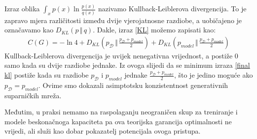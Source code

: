 Izraz oblika $\int_{x} p(x) \ln \frac{p(x)}{q(x)}$ nazivamo Kullback-Leiblerova divergencija. To je zapravo mjera različitosti između dvije vjerojatnosne razdiobe, a uobičajeno je označavamo kao $D_{KL}(p \, \Vert \, q)$. Dakle, 
izraz \ref{KL} možemo zapisati kao:
\begin{align}
C(G) = -\ln 4 + D_{KL}(p_{\mathcal{D}} \, \Vert \, \frac{p_{\mathcal{D}} + p_{model}}{2}) + D_{KL}(p_{model} \, \Vert \, \frac{p_{\mathcal{D}} + p_{model}}{2}) \label{final kl}
\end{align}
Kullback-Leiblerova divergencija je uvijek nenegativna vrijednost, a postiže 0 samo kada su dvije razdiobe jednake. Iz ovoga slijedi da se minimum izraza \ref{final kl} postiže kada su razdiobe $p_{\mathcal{D}}$ i $p_{model}$ jednake $\frac{p_{\mathcal{D}} + p_{model}}{2}$, što je jedino moguće ako $p_{\mathcal{D}} = p_{model}$. Ovime smo dokazali asimptotsku konzistentnost generativnih suparničkih mreža.

Međutim, u praksi nemamo na raspolaganju neograničen skup za treniranje i modele beskonačnoga kapaciteta pa ova teorijska garancija optimalnosti ne vrijedi, ali služi kao dobar pokazatelj potencijala ovoga pristupa.
